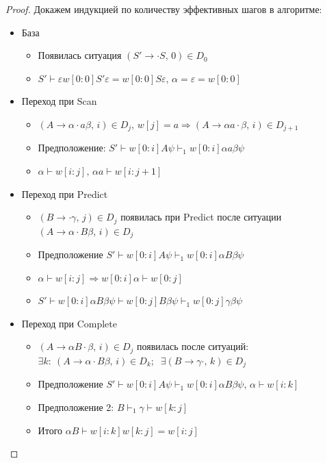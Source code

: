 \documentclass[a4paper,12pt]{article}
\theoremstyle{plain}
\theoremstyle{definition}
\theoremstyle{remark}
\begin{document}
\begin{proof}
	Докажем индукцией по количеству эффективных шагов в алгоритме:
	\begin{itemize}
		\item База
		      \begin{itemize}
			      \item Появилась ситуация $(S' \to \cdot S,\, 0) \in D_0$
			      \item $S' \vdash \varepsilon w[0 : 0]S' \varepsilon = w[0:0]S\varepsilon,\, \alpha = \varepsilon = w[0 : 0]$
		      \end{itemize}
		\item Переход при Scan
		      \begin{itemize}
			      \item $(A \to \alpha\cdot a \beta,\, i) \in D_j,\, w[j] = a \Rightarrow (A \to \alpha a \cdot \beta,\, i) \in D_{j + 1}$
			      \item Предположение: $S' \vdash w[0:i]A\psi \vdash_1 w[0:i]\alpha a \beta\psi$
			      \item $\alpha \vdash w[i : j],\, \alpha a \vdash w[i : j + 1]$
		      \end{itemize}
		\item Переход при Predict
		      \begin{itemize}
			      \item $(B \to \cdot\gamma,\, j) \in D_j$ появилась при Predict после ситуации $(A \to \alpha\cdot B \beta,\, i) \in D_j$
			      \item Предположение $S' \vdash w[0:i]A\psi \vdash_1 w[0:i]\alpha B \beta\psi$
			      \item $\alpha \vdash w[i:j] \Rightarrow w[0:i]\alpha \vdash w[0:j]$
			      \item $S' \vdash w[0:i]\alpha B\beta\psi \vdash w[0:j]B\beta\psi \vdash_1 w[0:j]\gamma\beta\psi$
		      \end{itemize}
		\item Переход при Complete
		      \begin{itemize}
			      \item $(A \to \alpha B \cdot\beta,\, i) \in D_j$ появилась после ситуаций: $\exists k :\: (A \to \alpha\cdot B \beta,\, i) \in D_k;\;\; \exists (B \to \gamma\cdot,\, k) \in D_j$
			      \item Предположение $S' \vdash w[0:i]A\psi \vdash_1 w[0:i]\alpha B\beta\psi,\, \alpha \vdash w[i:k]$
			      \item Предположение 2: $B \vdash_1 \gamma \vdash w[k:j]$
			      \item Итого $\alpha B \vdash w[i:k]w[k:j] = w[i:j]$
		      \end{itemize}
	\end{itemize}
\end{proof}
\end{document}
